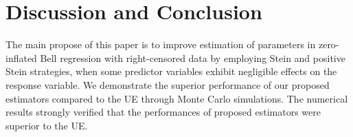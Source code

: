 \documentclass[twoside]{article}
\begin{document}
\section*{Discussion and Conclusion}   
The main propose of this paper is to improve estimation of parameters in zero-inflated Bell regression with right-censored data by employing Stein and positive Stein strategies, when some predictor variables exhibit negligible effects on the response variable. We demonstrate the superior performance of our proposed estimators compared to the UE through Monte Carlo simulations. The numerical results strongly verified that the performances of proposed estimators were superior to the UE. 




\end{document}
